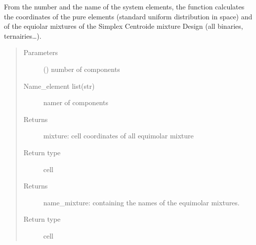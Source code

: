 \documentclass[letterpaper,10pt,english]{sphinxmanual}
\begin{document}
\label{\detokenize{ExperimentsPlannification:module-modules}}

\begin{fulllineitems}
\label{\detokenize{ExperimentsPlannification:modules.coordinates_name_centroid_points}}
\sphinxAtStartPar
From the number and the name of the system elements, the function
calculates the coordinates of the pure elements (standard uniform
distribution in space) and of the equiolar mixtures of the Simplex
Centroide mixture Design (all binaries, ternairies…).
\begin{quote}\begin{description}
\item[{Parameters}] \leavevmode
\sphinxAtStartPar
{} () \textendash{} number of components

\item[{Name\_element list(str)}] \leavevmode
\sphinxAtStartPar
namer of components

\item[{Returns}] \leavevmode
\sphinxAtStartPar
mixture: cell coordinates of all equimolar mixture

\item[{Return type}] \leavevmode
\sphinxAtStartPar
cell

\item[{Returns}] \leavevmode
\sphinxAtStartPar
name\_mixture: containing the names of the equimolar mixtures.

\item[{Return type}] \leavevmode
\sphinxAtStartPar
cell

\end{description}\end{quote}

\end{fulllineitems}

\label{\detokenize{ExperimentsPlannification:module-modules}}
\end{document}
